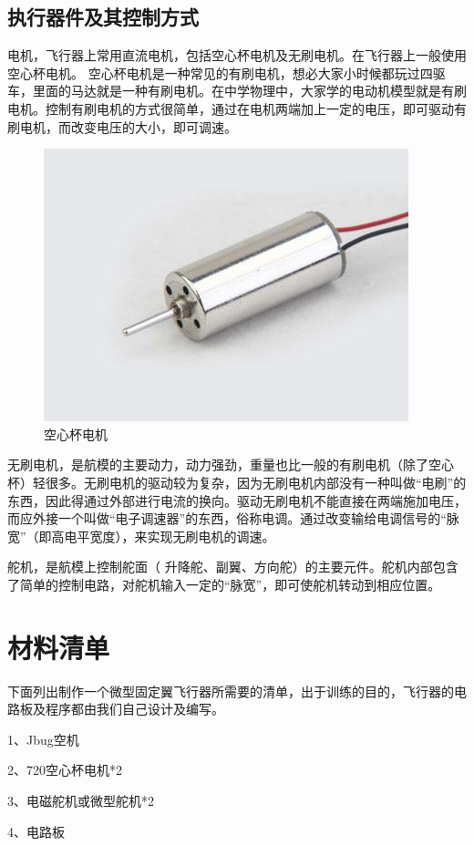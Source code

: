 \documentclass{article}
\begin{document}
\subsection{执行器件及其控制方式}
电机，飞行器上常用直流电机，包括空心杯电机及无刷电机。在飞行器上一般使用空心杯电机。
空心杯电机是一种常见的有刷电机，想必大家小时候都玩过四驱车，里面的马达就是一种有刷电机。在中学物理中，大家学的电动机模型就是有刷电机。控制有刷电机的方式很简单，通过在电机两端加上一定的电压，即可驱动有刷电机，而改变电压的大小，即可调速。
\begin{figure}[ht]
\centering
\includegraphics[scale=0.4]{空心杯.jpg}
\caption{空心杯电机}
\label{fig:label}
\end{figure}

无刷电机，是航模的主要动力，动力强劲，重量也比一般的有刷电机（除了空心杯）轻很多。无刷电机的驱动较为复杂，因为无刷电机内部没有一种叫做“电刷”的东西，因此得通过外部进行电流的换向。驱动无刷电机不能直接在两端施加电压，而应外接一个叫做“电子调速器”的东西，俗称电调。通过改变输给电调信号的“脉宽”（即高电平宽度），来实现无刷电机的调速。

舵机，是航模上控制舵面（ 升降舵、副翼、方向舵）的主要元件。舵机内部包含了简单的控制电路，对舵机输入一定的“脉宽”，即可使舵机转动到相应位置。

\section{材料清单}
下面列出制作一个微型固定翼飞行器所需要的清单，出于训练的目的，飞行器的电路板及程序都由我们自己设计及编写。

1、Jbug空机

2、720空心杯电机*2

3、电磁舵机或微型舵机*2

4、电路板
\end{document}
